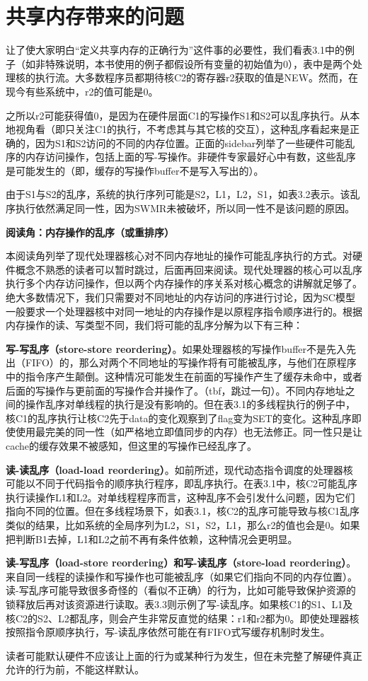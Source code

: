 \documentclass[UTF-8]{ctexrep}
\begin{document}
\section{共享内存带来的问题}
让了使大家明白“定义共享内存的正确行为”这件事的必要性，我们看表3.1中的例子（如非特殊说明，本书使用的例子都假设所有变量的初始值为0），表中是两个处理核的执行流。大多数程序员都期待核C2的寄存器r2获取的值是NEW。然而，在现今有些系统中，r2的值可能是0。
\par 之所以r2可能获得值0，是因为在硬件层面C1的写操作S1和S2可以乱序执行。从本地视角看（即只关注C1的执行，不考虑其与其它核的交互），这种乱序看起来是正确的，因为S1和S2访问的不同的内存位置。正面的sidebar列举了一些硬件可能乱序的内存访问操作，包括上面的写-写操作。非硬件专家最好心中有数，这些乱序是可能发生的（即，缓存的写操作buffer不是写入写出的）。
\par 由于S1与S2的乱序，系统的执行序列可能是S2，L1，L2，S1，如表3.2表示。该乱序执行依然满足同一性，因为SWMR未被破坏，所以同一性不是该问题的原因。
\begin{sidebarbox}
\centerline{\textbf{阅读角：内存操作的乱序（或重排序）}}
\par 本阅读角列举了现代处理器核心对不同内存地址的操作可能乱序执行的方式。对硬件概念不熟悉的读者可以暂时跳过，后面再回来阅读。现代处理器的核心可以乱序执行多个内存访问操作，但以两个内存操作的序关系对核心概念的讲解就足够了。绝大多数情况下，我们只需要对不同地址的内存访问的序进行讨论，因为SC模型一般要求一个处理器核中对同一地址的内存操作是以原程序指令顺序进行的。根据内存操作的读、写类型不同，我们将可能的乱序分解为以下有三种：
\par \textbf{写-写乱序（store-store reordering）}。如果处理器核的写操作buffer不是先入先出（FIFO）的，那么对两个不同地址的写操作将有可能被乱序，与他们在原程序中的指令序产生颠倒。这种情况可能发生在前面的写操作产生了缓存未命中，或者后面的写操作与更前面的写操作合并操作了。（tbf，跳过一句）。不同内存地址之间的操作乱序对单线程的执行是没有影响的。但在表3.1的多线程执行的例子中，核C1的乱序执行让核C2先于data的变化观察到了flag变为SET的变化。这种乱序即使使用最完美的同一性（如严格地立即值同步的内存）也无法修正。同一性只是让cache的缓存效果不被感知，但这里的写操作已经乱序了。
\par \textbf{读-读乱序（load-load reordering）}。如前所述，现代动态指令调度的处理器核可能以不同于代码指令的顺序执行程序，即乱序执行。在表3.1中，核C2可能乱序执行读操作L1和L2。对单线程程序而言，这种乱序不会引发什么问题，因为它们指向不同的位置。但在多线程场景下，如表3.1，核C2的乱序可能导致与核C1乱序类似的结果，比如系统的全局序列为L2，S1，S2，L1，那么r2的值也会是0。如果把判断B1去掉，L1和L2之前不再有条件依赖，这种情况会更明显。
\par \textbf{读-写乱序（load-store reordering）和写-读乱序（store-load reordering）}。来自同一线程的读操作和写操作也可能被乱序（如果它们指向不同的内存位置）。读-写乱序可能导致很多奇怪的（看似不正确）的行为，比如可能导致保护资源的锁释放后再对该资源进行读取。表3.3则示例了写-读乱序。如果核C1的S1、L1及核C2的S2、L2都乱序，则会产生非常反直觉的结果：r1和r2都为0。即使处理器核按照指令原顺序执行，写-读乱序依然可能在有FIFO式写缓存机制时发生。
\par 读者可能默认硬件不应该让上面的行为或某种行为发生，但在未完整了解硬件真正允许的行为前，不能这样默认。
\end{sidebarbox}
\end{document}
